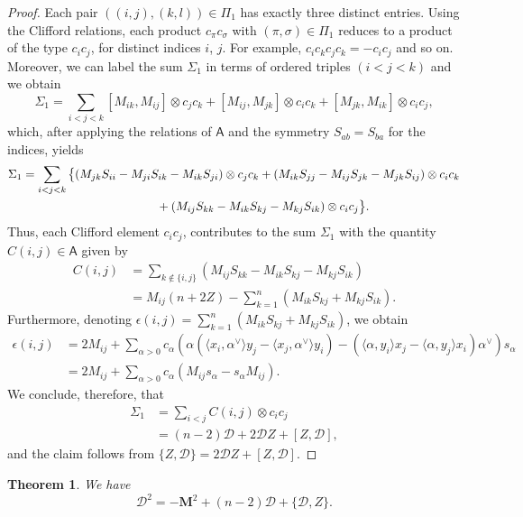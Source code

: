 \documentclass[10pt,a4paper]{amsart}
\numberwithin{equation}{section}
\newtheorem{Theorem}{Theorem}[section]
\begin{document}
\begin{proof}
Each pair $((i,j),(k,l)) \in \Pi_1$ has exactly three distinct entries. Using the Clifford relations, each product $c_\pi c_\sigma$ with $(\pi,\sigma)\in\Pi_1$ reduces to a product of the type $c_ic_j$, for distinct indices $i$, $j$. For example, $c_ic_kc_jc_k = -c_ic_j$ and so on.
Moreover, we can label the sum $\Sigma_1$ in terms of ordered triples $(i<j<k)$ and we obtain
\begin{equation*}
 \Sigma_1 = \sum_{i<j<k} [M_{ik},M_{ij}]\otimes c_jc_k +
 [M_{ij},M_{jk}]\otimes c_ic_k + [M_{jk},M_{ik}]\otimes c_ic_j,
\end{equation*}
which, after applying the relations of $\mathsf{A}$ and the symmetry $S_{ab} = S_{ba}$ for the indices, yields
\begin{gather*}
\Sigma_1 = \sum_{i<j<k}\big\{(M_{jk}S_{ii} - M_{ji}S_{ik} - M_{ik}S_{ji})\otimes c_jc_k
+ (M_{ik}S_{jj} - M_{ij}S_{jk} - M_{jk}S_{ij})\otimes c_ic_k \\
\hphantom{\Sigma_1 = \sum_{i<j<k}}{}
 + (M_{ij}S_{kk} - M_{ik}S_{kj} - M_{kj}S_{ik})\otimes c_ic_j\big\}.
\end{gather*}
Thus, each Clifford element $c_ic_j$, contributes to the sum $\Sigma_1$ with the quantity $C(i,j)\in\mathsf{A}$ given by
\begin{align*}
C(i,j) &= \sum_{k\notin\{i,j\}} (M_{ij}S_{kk} - M_{ik}S_{kj} - M_{kj}S_{ik})\\
&= M_{ij}(n+2Z) - \sum_{k=1}^n (M_{ik}S_{kj} + M_{kj}S_{ik}).
\end{align*}
Furthermore, denoting $\epsilon(i,j) = \sum_{k=1}^n (M_{ik}S_{kj} + M_{kj}S_{ik})$, we obtain
\begin{align*}
 \epsilon(i,j) &= 2M_{ij} +
 \sum_{\alpha>0}c_\alpha (\alpha(\langle x_i,\alpha^\vee\rangle y_j - \langle x_j,\alpha^\vee\rangle y_i) - (\langle\alpha,y_i\rangle x_j - \langle\alpha,y_j\rangle x_i)\alpha^\vee)s_\alpha\\
 &= 2M_{ij} + \sum_{\alpha>0}c_\alpha(M_{ij}s_\alpha - s_\alpha M_{ij}).
\end{align*}
We conclude, therefore,
that
\begin{align*}
 \Sigma_1 &= \sum_{i<j}C(i,j)\otimes c_ic_j\\
 &=(n-2)\mathcal{D} + 2\mathcal{D}Z + [Z,\mathcal{D}],
\end{align*}
and the claim follows from $\{Z,\mathcal{D}\} = 2\mathcal{D}Z + [Z,\mathcal{D}]$.
\end{proof}


\begin{Theorem}
We have
\[
\mathcal{D}^2 = -\mathbf{M}^2 + (n-2)\mathcal{D} + \{\mathcal{D},Z\}.
\]
\end{Theorem}
\end{document}
